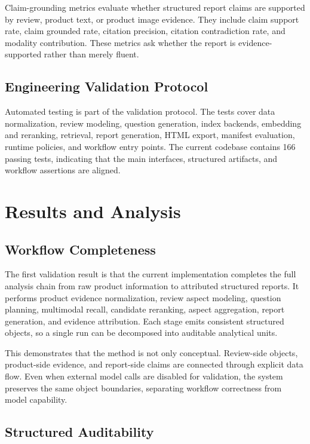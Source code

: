 \documentclass[11pt]{article}
\begin{document}
Claim-grounding metrics evaluate whether structured report claims are supported by review, product text, or product image evidence. They include claim support rate, claim grounded rate, citation precision, citation contradiction rate, and modality contribution. These metrics ask whether the report is evidence-supported rather than merely fluent.

\subsection{Engineering Validation Protocol}

Automated testing is part of the validation protocol. The tests cover data normalization, review modeling, question generation, index backends, embedding and reranking, retrieval, report generation, HTML export, manifest evaluation, runtime policies, and workflow entry points. The current codebase contains 166 passing tests, indicating that the main interfaces, structured artifacts, and workflow assertions are aligned.

\section{Results and Analysis}
\subsection{Workflow Completeness}

The first validation result is that the current implementation completes the full analysis chain from raw product information to attributed structured reports. It performs product evidence normalization, review aspect modeling, question planning, multimodal recall, candidate reranking, aspect aggregation, report generation, and evidence attribution. Each stage emits consistent structured objects, so a single run can be decomposed into auditable analytical units.

This demonstrates that the method is not only conceptual. Review-side objects, product-side evidence, and report-side claims are connected through explicit data flow. Even when external model calls are disabled for validation, the system preserves the same object boundaries, separating workflow correctness from model capability.

\subsection{Structured Auditability}
\end{document}
